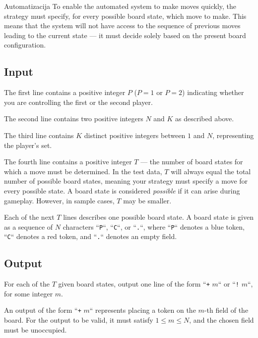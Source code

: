 \begin{statement}[
  problempoints=100,
  timelimit=6 seconds,
  memorylimit=512 MiB,
]{Automatizacija}
To enable the automated system to make moves quickly,  
the strategy must specify, for every possible board state, which move to make.  
This means that the system will not have access to the sequence of previous moves 
leading to the current state — it must decide solely based on the present board configuration.

\subsection*{Input}

The first line contains a positive integer $P$ ($P=1$ or $P=2$) indicating 
whether you are controlling the first or the second player.

The second line contains two positive integers $N$ and $K$ as described above.

The third line contains $K$ distinct positive integers between $1$ and $N$, 
representing the player's set.

The fourth line contains a positive integer $T$ — the number of board states 
for which a move must be determined.  
In the test data, $T$ will always equal the total number of possible board states, 
meaning your strategy must specify a move for every possible state.  
A board state is considered \textit{possible} if it can arise during gameplay.  
However, in sample cases, $T$ may be smaller.

Each of the next $T$ lines describes one possible board state.  
A board state is given as a sequence of $N$ characters “\texttt{P}“, “\texttt{C}“, or “\texttt{.}“, 
where “\texttt{P}“ denotes a blue token, “\texttt{C}“ denotes a red token, 
and “\texttt{.}“ denotes an empty field.

\subsection*{Output}

For each of the $T$ given board states, output 
one line of the form “\texttt{+} $m$“ or “\texttt{!} $m$“, for some integer $m$.
\vspace{-0.15em}

An output of the form “\texttt{+} $m$“ represents placing a token 
on the $m$-th field of the board.  
For the output to be valid, it must satisfy $1 \leq m \leq N$, 
and the chosen field must be unoccupied.


\end{statement}
